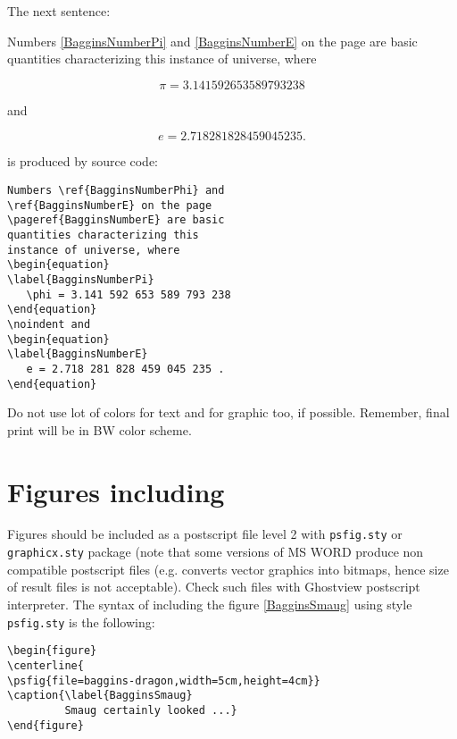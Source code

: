 \begin{multicols}{2}
The next sentence: 

Numbers \ref{BagginsNumberPi} and \ref{BagginsNumberE} on the page
\pageref{BagginsNumberE} are basic quantities characterizing this instance of universe,
where

\begin{equation}
\label{BagginsNumberPi}
\pi = 3.141 592 653 589 793 238
\end{equation}

\noindent and

\begin{equation}
\label{BagginsNumberE}
e = 2.718 281 828 459 045 235 .
\end{equation}

is produced by source code:

\begin{Verbatim}[fontsize=\relsize{-2}]
Numbers \ref{BagginsNumberPhi} and 
\ref{BagginsNumberE} on the page 
\pageref{BagginsNumberE} are basic 
quantities characterizing this 
instance of universe, where
\begin{equation}
\label{BagginsNumberPi} 
   \phi = 3.141 592 653 589 793 238
\end{equation}
\noindent and
\begin{equation}
\label{BagginsNumberE} 
   e = 2.718 281 828 459 045 235 .
\end{equation}
\end{Verbatim}


Do not use lot of colors for text and for graphic too, if possible. Remember, final print
will be in BW color scheme.


\section{Figures including }

Figures should be included as a postscript file level 2 with {\tt psfig.sty} or {\tt
  graphicx.sty} package (note that some versions of MS WORD produce
non compatible postscript files (e.g. converts vector graphics into bitmaps, hence size of
result files is not acceptable). Check such files with Ghostview postscript interpreter.
The syntax of including the figure \ref{BagginsSmaug} using style {\tt psfig.sty} is the
following:


\begin{Verbatim}[fontsize=\relsize{-2}]
\begin{figure}
\centerline{
\psfig{file=baggins-dragon,width=5cm,height=4cm}}
\caption{\label{BagginsSmaug}
         Smaug certainly looked ...}
\end{figure}
\end{Verbatim}


\end{multicols}
